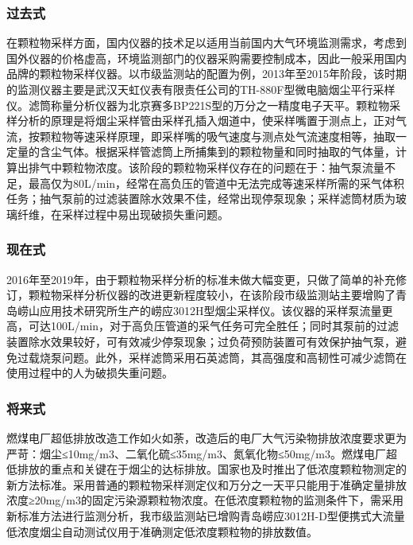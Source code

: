 \documentclass[]{book}
\begin{document}
\hypertarget{ux8fc7ux53bbux5f0f-1}{%
\subsubsection{过去式}\label{ux8fc7ux53bbux5f0f-1}}

在颗粒物采样方面，国内仪器的技术足以适用当前国内大气环境监测需求，考虑到国外仪器的价格虚高，环境监测部门的仪器采购需要控制成本，因此一般采用国内品牌的颗粒物采样仪器。以市级监测站的配置为例，2013年至2015年阶段，该时期的监测仪器主要是武汉天虹仪表有限责任公司的TH-880F型微电脑烟尘平行采样仪。滤筒称量分析仪器为北京赛多BP221S型的万分之一精度电子天平。颗粒物采样分析的原理是将烟尘采样管由采样孔插入烟道中，使采样嘴置于测点上，正对气流，按颗粒物等速采样原理，即采样嘴的吸气速度与测点处气流速度相等，抽取一定量的含尘气体。根据采样管滤筒上所捕集到的颗粒物量和同时抽取的气体量，计算出排气中颗粒物浓度。该阶段的颗粒物采样仪存在的问题在于：抽气泵流量不足，最高仅为80L/min，经常在高负压的管道中无法完成等速采样所需的采气体积任务；抽气泵前的过滤装置除水效果不佳，经常出现停泵现象；采样滤筒材质为玻璃纤维，在采样过程中易出现破损失重问题。

\hypertarget{ux73b0ux5728ux5f0f-1}{%
\subsubsection{现在式}\label{ux73b0ux5728ux5f0f-1}}

2016年至2019年，由于颗粒物采样分析的标准未做大幅变更，只做了简单的补充修订，颗粒物采样分析仪器的改进更新程度较小，在该阶段市级监测站主要增购了青岛崂山应用技术研究所生产的崂应3012H型烟尘采样仪。该仪器的采样泵流量更高，可达100L/min，对于高负压管道的采气任务可完全胜任；同时其泵前的过滤装置除水效果较好，可有效减少停泵现象；过负荷预防装置可有效保护抽气泵，避免过载烧泵问题。此外，采样滤筒采用石英滤筒，其高强度和高韧性可减少滤筒在使用过程中的人为破损失重问题。

\hypertarget{ux5c06ux6765ux5f0f-1}{%
\subsubsection{将来式}\label{ux5c06ux6765ux5f0f-1}}

燃煤电厂超低排放改造工作如火如荼，改造后的电厂大气污染物排放浓度要求更为严苛：烟尘≤10mg/m3、二氧化硫≤35mg/m3、氮氧化物≤50mg/m3。燃煤电厂超低排放的重点和关键在于烟尘的达标排放。国家也及时推出了低浓度颗粒物测定的新方法标准。采用普通的颗粒物采样测定仪和万分之一天平只能用于准确定量排放浓度≥20mg/m3的固定污染源颗粒物浓度。在低浓度颗粒物的监测条件下，需采用新标准方法进行监测分析，我市级监测站已增购青岛崂应3012H-D型便携式大流量低浓度烟尘自动测试仪用于准确测定低浓度颗粒物的排放数值。
\end{document}
